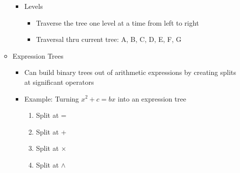 \documentclass{article}
\begin{document}
\begin{itemize}
\begin{itemize}
\begin{itemize}
\begin{itemize}
                        \end{itemize}
                    \item Levels
                        \begin{itemize}
                            \item Traverse the tree one level at a time from left to right
                            \item Traversal thru current tree: A, B, C, D, E, F, G
                        \end{itemize}
                \end{itemize}
            \item Expression Trees
                \begin{itemize}
                    \item Can build binary trees out of arithmetic expressions by creating splits at significant operators
                    \item Example: Turning $x^2 + c = bx$ into an expression tree
                        \begin{enumerate}
                            \item Split at =

                            \item Split at +

                            \item Split at $\times$

                            \item Split at $\wedge$


\end{enumerate}
\end{itemize}
\end{itemize}
\end{itemize}
\end{document}

